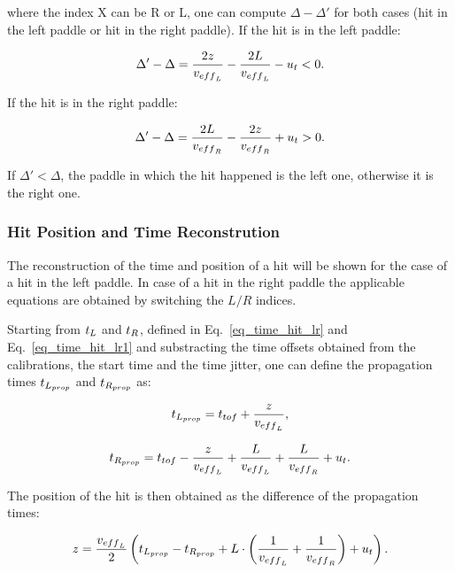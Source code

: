 \documentclass{elsart}
\begin{document}
\noindent
where the index X can be R or L, one can compute $\Delta-\Delta'$ for both cases (hit in the left paddle or hit
in the right paddle). If the hit is in the left paddle:

\begin{equation}
\Delta'-\Delta= \frac{2z}{v_{\rm{eff}_L}} - \frac{2L}{v_{\rm{eff}_L}} -u_{\rm{t}} <0.
\end{equation}

\noindent
If the hit is in the right paddle:

\begin{equation}
\Delta'-\Delta= \frac{2L}{v_{\rm{eff}_{\rm{R}}}}-\frac{2z}{v_{\rm{eff}_{\rm{R}}}} +u_{\rm{t}} >0.
\end{equation}

\noindent
If $\Delta'<\Delta$, the paddle in which the hit happened is the left one, otherwise it is the right one.

\subsubsection{Hit Position and Time Reconstrution}

The reconstruction of the time and position of a hit will be shown for the case of a hit in the left paddle. In
case of a hit in the right paddle the applicable equations are obtained by switching the $L/R$ indices.

Starting from $t_{\rm{L}}$ and $t_{\rm{R}}$, defined in Eq.~\ref{eq_time_hit_lr} and Eq.~\ref{eq_time_hit_lr1}
and substracting the time offsets obtained from the calibrations, the start time and the time jitter, one can
define the propagation times $t_{\rm{L}_{\rm{prop}}}$ and $t_{\rm{R}_{\rm{prop}}}$ as:

\begin{equation}
t_{\rm{L}_{\rm{prop}}}=t_{\rm{tof}}+\frac{z}{v_{\rm{eff}_{\rm{L}}}},
\end{equation}

\begin{equation}
t_{\rm{R}_{\rm{prop}}}=t_{\rm{tof}}-\frac{z}{v_{\rm{eff}_{\rm{L}}}}+\frac{L}{v_{\rm{eff}_{\rm{L}}}}
+\frac{L}{v_{\rm{eff}_{\rm{R}}}}+u_{\rm{t}}.
\end{equation}

The position of the hit is then obtained as the difference of the propagation times:

\begin{equation}
z=\frac{v_{\rm{eff}_{\rm{L}}}}{2} \left(t_{\rm{L}_{\rm{prop}}}-t_{\rm{R}_{\rm{prop}}}
+ L \cdot \left(\frac{1}{v_{\rm{eff}_{\rm{L}}}}+\frac{1}{v_{\rm{eff}_{\rm{R}}}}\right)  +u_{\rm{t}}\right).
\end{equation}
\end{document}
